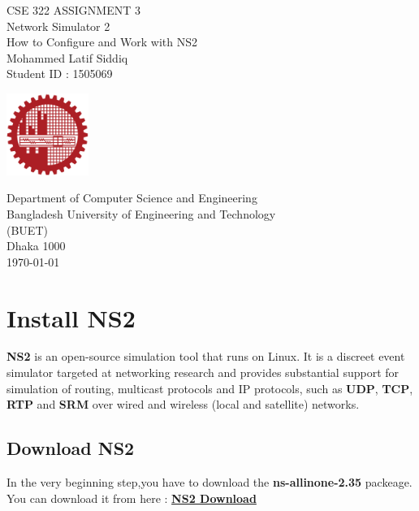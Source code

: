 \documentclass[hidelinks,12pt]{report}
\begin{document}
\begin{titlepage}
    \begin{center}
        \vspace*{1cm}
        
        \Large
         CSE 322 ASSIGNMENT 3\\
         Network Simulator 2  \\
         How to Configure and Work with NS2\\
        \normalsize
        \vspace{1.5cm}
        Mohammed Latif Siddiq\\
        Student ID : 1505069
        
        \vfill
        
        \vspace{0.8cm}
        
        \includegraphics[width=0.2\textwidth]{buet_logo.png}
        
        \Large
        Department of Computer Science and Engineering\\
       Bangladesh University of Engineering and Technology\\
      (BUET)\\
      Dhaka 1000\\
       \today
        
    \end{center}
\end{titlepage}

\newpage

\tableofcontents
\chapter{Install NS2}
\textbf{NS2} is an open-source simulation tool that runs on Linux. It is a discreet event simulator targeted at networking research and provides substantial support for simulation of routing, multicast protocols and IP protocols, such as \textbf{UDP}, \textbf{TCP}, \textbf{RTP} and \textbf{SRM} over wired and wireless (local and satellite) networks.
\section{Download NS2}
In the very beginning step,you have to download the \textbf{ns-allinone-2.35} packeage.
You can download it from here : \href{https://sourceforge.net/projects/nsnam/}{\textbf{NS2 Download}}
\end{document}
